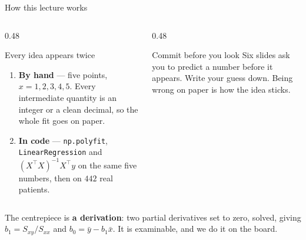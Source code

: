 \documentclass[aspectratio=169]{beamer}
\begin{document}
\begin{frame}[shrink=6]{How this lecture works}
  \begin{columns}[T]
    \begin{column}{0.48\textwidth}
      \begin{block}{Every idea appears twice}
        \begin{enumerate}
          \item \textbf{By hand} --- five points, $x = 1,2,3,4,5$. Every
            intermediate quantity is an integer or a clean decimal, so the
            whole fit goes on paper.
          \item \textbf{In code} --- \texttt{np.polyfit},
            \texttt{LinearRegression} and $(X^{\!\top}\!X)^{-1}X^{\!\top}y$
            on the same five numbers, then on $442$ real patients.
        \end{enumerate}
      \end{block}
    \end{column}
    \begin{column}{0.48\textwidth}
      \begin{alertblock}{Commit before you look}
        Six slides ask you to predict a number before it appears. Write your
        guess down. Being wrong on paper is how the idea sticks.
      \end{alertblock}
    \end{column}
  \end{columns}
  \vspace{0.3em}
  \begin{center}
    \small The centrepiece is \textbf{a derivation}: two partial derivatives
    set to zero, solved, giving $b_1 = S_{xy}/S_{xx}$ and
    $b_0 = \bar y - b_1\bar x$. It is examinable, and we do it on the board.
  \end{center}
\end{frame}
\end{document}
